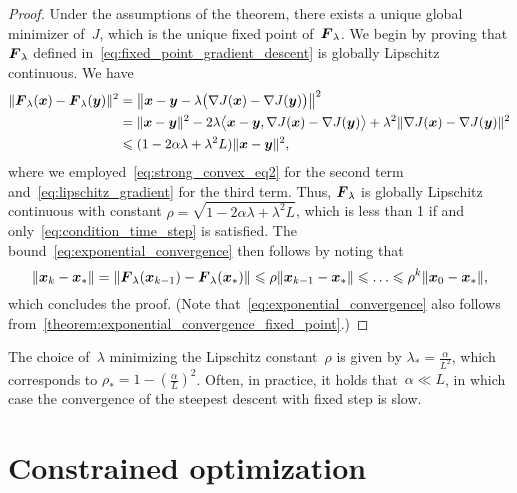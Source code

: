 \begin{proof}
    Under the assumptions of the theorem,
    there exists a unique global minimizer of~$J$,
    which is the unique fixed point of~$\vect F_{\lambda}$.
    We begin by proving that $\vect F_{\lambda}$ defined in~\eqref{eq:fixed_point_gradient_descent} is globally Lipschitz continuous.
    We have
    \begin{align*}
        \norm{ \vect F_{\lambda}(\vect x) - \vect F_{\lambda}(\vect y) }^2
        &= \norm*{ \vect x - \vect y - \lambda \bigl(\nabla J(\vect x) - \nabla J(\vect y) \bigr) }^2 \\
        &= \norm{\vect x - \vect y}^2 - 2 \lambda \ip[\big]{\vect x - \vect y, \nabla J(\vect x) - \nabla J(\vect y)} + \lambda^2 \norm{\nabla J(\vect x) - \nabla J(\vect y)}^2 \\
        &\leq (1 - 2 \alpha \lambda + \lambda^2 L) \norm{\vect x - \vect y}^2,
    \end{align*}
    where we employed~\eqref{eq:strong_convex_eq2} for the second term and~\eqref{eq:lipschitz_gradient} for the third term.
    Thus, $\vect F_{\lambda}$ is globally Lipschitz continuous with constant $\rho = \sqrt{1 - 2 \alpha \lambda + \lambda^2 L}$,
    which is less than 1 if and only~\eqref{eq:condition_time_step} is satisfied.
    The bound~\eqref{eq:exponential_convergence} then follows by noting that
    \[
        \norm{\vect x_k - \vect x_*} = \norm{\vect F_{\lambda}(\vect x_{k-1}) - \vect F_{\lambda} (\vect x_*)}
        \leq \rho \norm{\vect x_{k-1} - \vect x_*} \leq \dots \leq \rho^k \norm{\vect x_0 - \vect x_*},
    \]
    which concludes the proof.
    (Note that~\eqref{eq:exponential_convergence} also follows from~\cref{theorem:exponential_convergence_fixed_point}.)
\end{proof}

\begin{remark}
    The choice of~$\lambda$ minimizing the Lipschitz constant~$\rho$ is given by $\lambda_* = \frac{\alpha}{L^2}$,
    which corresponds to $\rho_* = 1 - \left(\frac{\alpha}{L}\right)^2$.
    Often, in practice, it holds that~$\alpha \ll L$,
    in which case the convergence of the steepest descent with fixed step is slow.
\end{remark}

\section{Constrained optimization}
\label{sec:constrained_optimization}

